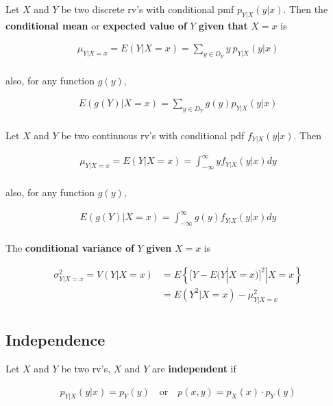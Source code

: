 \begin{definition}
    Let $X$ and $Y$ be two discrete rv's with conditional pmf $p_{Y|X}(y|x)$. Then the \textbf{conditional mean} or \textbf{expected value of} $Y$ \textbf{given that} $X=x$ is 

    \begin{align*}
        \mu_{Y|X=x} = E(Y|X=x) = \sum_{y\in D_Y} y\ p_{Y|X}(y|x) \\
    \end{align*}

    also, for any function $g(y)$, 

    \begin{align*}
        E(g(Y)|X=x) = \sum_{y\in D_Y} g(y)p_{Y|X}(y|x) \\
    \end{align*}

    Let $X$ and $Y$ be two continuous rv's with conditional pdf $f_{Y|X}(y|x)$. Then 
    
    \begin{align*}
        \mu_{Y|X=x} = E(Y|X=x) = \int_{-\infty}^\infty yf_{Y|X}(y|x) dy \\
    \end{align*}

    also, for any function $g(y)$, 

    \begin{align*}
        E(g(Y)|X=x) = \int_{-\infty}^\infty g(y)f_{Y|X}(y|x) dy \\
    \end{align*}

    The \textbf{conditional variance of} $Y$ \textbf{given} $X=x$ is 

    \begin{align*}
        \sigma_{Y|X=x}^2 = V(Y|X=x) & = E\left\{[Y-E(Y|X=x)]^2|X=x\right\} \\
        & = E(Y^2|X=x) - \mu_{Y|X=x}^2 \\
    \end{align*}
\end{definition}

\subsection{Independence}

\begin{proposition}
    Let $X$ and $Y$ be two rv's, $X$ and $Y$ are \textbf{independent} if 

    \begin{align*}
        p_{Y|X}(y|x) = p_Y(y) \quad \text{or} \quad p(x,y) = p_X(x)\cdot p_Y(y) \\
    \end{align*}
\end{proposition}

